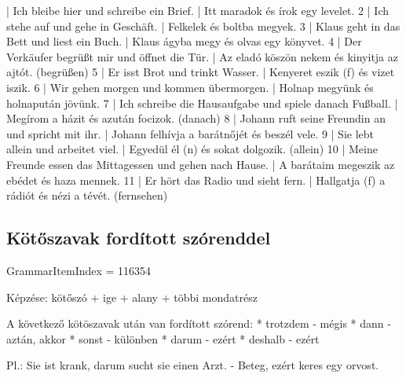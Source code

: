 \documentclass{article}
\newenvironment{desc}{\verbatim}{\endverbatim}
\newenvironment{exmp}{\verbatim}{\endverbatim}
\begin{document}
\begin{exmp}
1 | Ich bleibe hier und schreibe ein Brief. | Itt maradok és írok egy levelet.
2 | Ich stehe auf und gehe in Geschäft. | Felkelek és boltba megyek.
3 | Klaus geht in das Bett und liest ein Buch. | Klaus ágyba megy és olvas egy könyvet.
4 | Der Verkäufer begrüßt mir und öffnet die Tür. | Az eladó köszön nekem és kinyitja az ajtót. (begrüßen)
5 | Er isst Brot und trinkt Wasser. | Kenyeret eszik (f) és vizet iszik.
6 | Wir gehen morgen und kommen übermorgen. | Holnap megyünk és holnapután jövünk.
7 | Ich schreibe die Hausaufgabe und spiele danach Fußball. | Megírom a házit és azután focizok. (danach)
8 | Johann ruft seine Freundin an und spricht mit ihr. | Johann felhívja a barátnőjét és beszél vele.
9 | Sie lebt allein und arbeitet viel. | Egyedül él (n) és sokat dolgozik. (allein)
10 | Meine Freunde essen das Mittagessen und gehen nach Hause. | A barátaim megeszik az ebédet és haza mennek.
11 | Er hört das Radio und sieht fern. | Hallgatja (f) a rádiót és nézi a tévét. (fernsehen)
\end{exmp}

\subsection{Kötőszavak fordított szórenddel}

GrammarItemIndex = 116354

\begin{desc}
Képzése: kötőszó + ige + alany + többi mondatrész

A következő kötöszavak után van fordított szórend:
* trotzdem - mégis
* dann - aztán, akkor
* sonst - különben
* darum - ezért
* deshalb - ezért

Pl.: Sie ist krank, darum sucht sie einen Arzt. - Beteg, ezért keres egy orvost.
\end{desc}
\end{document}
